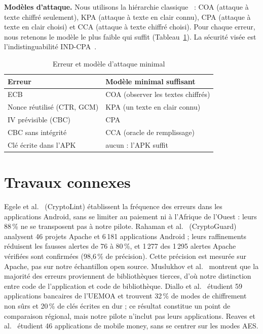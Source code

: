 \documentclass[conference,a4paper]{IEEEtran}
\begin{document}
\textbf{Modèles d'attaque.} Nous utilisons la hiérarchie classique~\cite{paar2024} : COA (attaque à texte chiffré seulement), KPA (attaque à texte en clair connu), CPA (attaque à texte en clair choisi) et CCA (attaque à texte chiffré choisi). Pour chaque erreur, nous retenons le modèle le plus faible qui suffit (Tableau~\ref{tab:modeles}). La sécurité visée est l'indistinguabilité IND-CPA~\cite{bellare1997}.

\begin{table}[t]
\caption{Erreur et modèle d'attaque minimal}
\label{tab:modeles}
\centering\small
\begin{tabular}{p{3.3cm}p{4.3cm}}
\toprule
Erreur & Modèle minimal suffisant \\
\midrule
ECB & COA (observer les textes chiffrés) \\
Nonce réutilisé (CTR, GCM) & KPA (un texte en clair connu) \\
IV prévisible (CBC) & CPA \\
CBC sans intégrité & CCA (oracle de remplissage) \\
Clé écrite dans l'APK & aucun : l'APK suffit \\
\bottomrule
\end{tabular}
\end{table}

\section{Travaux connexes}

Egele et al.~\cite{egele2013} (CryptoLint) établissent la fréquence des erreurs dans les applications Android, sans se limiter au paiement ni à l'Afrique de l'Ouest : leurs 88\,\% ne se transposent pas à notre pilote. Rahaman et al.~\cite{rahaman2019} (CryptoGuard) analysent 46 projets Apache et 6\,181 applications Android ; leurs raffinements réduisent les fausses alertes de 76 à 80\,\%, et 1\,277 des 1\,295 alertes Apache vérifiées sont confirmées (98,6\,\% de précision). Cette précision est mesurée sur Apache, pas sur notre échantillon open source. Muslukhov et al.~\cite{muslukhov2018} montrent que la majorité des erreurs proviennent de bibliothèques tierces, d'où notre distinction entre code de l'application et code de bibliothèque. Diallo et al.~\cite{diallo2024} étudient 59 applications bancaires de l'UEMOA et trouvent 32\,\% de modes de chiffrement non sûrs et 20\,\% de clés écrites en dur ; ce résultat constitue un point de comparaison régional, mais notre pilote n'inclut pas leurs applications. Reaves et al.~\cite{reaves2017} étudient 46 applications de mobile money, sans se centrer sur les modes AES.
\end{document}
